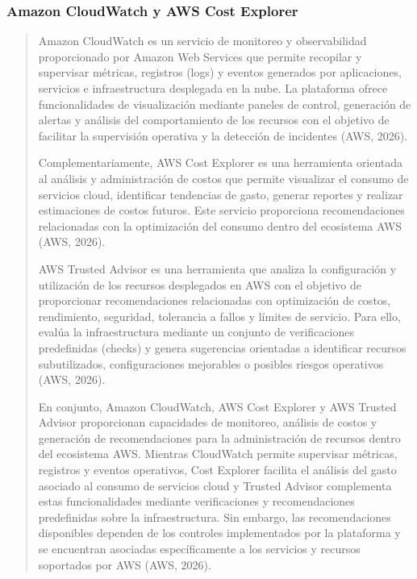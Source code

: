 \documentclass[
]{article}
\begin{document}
\subsubsection{Amazon CloudWatch y AWS Cost
Explorer}\label{amazon-cloudwatch-y-aws-cost-explorer}

\begin{quote}
Amazon CloudWatch es un servicio de monitoreo y observabilidad
proporcionado por Amazon Web Services que permite recopilar y supervisar
métricas, registros (logs) y eventos generados por aplicaciones,
servicios e infraestructura desplegada en la nube. La plataforma ofrece
funcionalidades de visualización mediante paneles de control, generación
de alertas y análisis del comportamiento de los recursos con el objetivo
de facilitar la supervisión operativa y la detección de incidentes (AWS,
2026).

Complementariamente, AWS Cost Explorer es una herramienta orientada al
análisis y administración de costos que permite visualizar el consumo de
servicios cloud, identificar tendencias de gasto, generar reportes y
realizar estimaciones de costos futuros. Este servicio proporciona
recomendaciones relacionadas con la optimización del consumo dentro del
ecosistema AWS (AWS, 2026).

AWS Trusted Advisor es una herramienta que analiza la configuración y
utilización de los recursos desplegados en AWS con el objetivo de
proporcionar recomendaciones relacionadas con optimización de costos,
rendimiento, seguridad, tolerancia a fallos y límites de servicio. Para
ello, evalúa la infraestructura mediante un conjunto de verificaciones
predefinidas (checks) y genera sugerencias orientadas a identificar
recursos subutilizados, configuraciones mejorables o posibles riesgos
operativos (AWS, 2026).

En conjunto, Amazon CloudWatch, AWS Cost Explorer y AWS Trusted Advisor
proporcionan capacidades de monitoreo, análisis de costos y generación
de recomendaciones para la administración de recursos dentro del
ecosistema AWS. Mientras CloudWatch permite supervisar métricas,
registros y eventos operativos, Cost Explorer facilita el análisis del
gasto asociado al consumo de servicios cloud y Trusted Advisor
complementa estas funcionalidades mediante verificaciones y
recomendaciones predefinidas sobre la infraestructura. Sin embargo, las
recomendaciones disponibles dependen de los controles implementados por
la plataforma y se encuentran asociadas específicamente a los servicios
y recursos soportados por AWS (AWS, 2026).
\end{quote}
\end{document}
